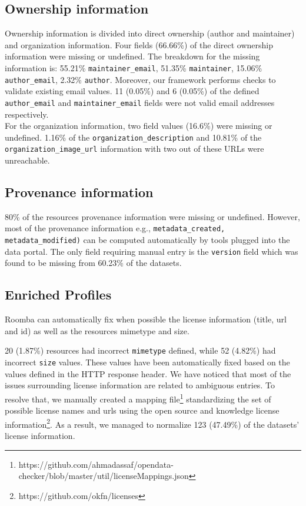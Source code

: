 \documentclass[runningheads,a4paper]{llncs}
\begin{document}
\subsection{Ownership information} Ownership information is divided into direct ownership (author and maintainer) and organization information. Four fields (66.66\%) of the direct ownership information were missing or undefined. The breakdown for the missing information is: 55.21\% \texttt{maintainer\_email}, 51.35\% \texttt{maintainer}, 15.06\% \texttt{author\_email}, 2.32\% \texttt{author}. Moreover, our framework performs checks to validate existing email values. 11 (0.05\%) and 6 (0.05\%) of the defined \texttt{author\_email} and \texttt{maintainer\_email} fields were not valid email addresses respectively.\\
For the organization information, two field values (16.6\%) were missing or undefined. 1.16\% of the \texttt{organization\_description} and 10.81\% of the \texttt{organization\-\_image\_url} information with two out of these URLs were unreachable.

\subsection{Provenance information} 80\% of the resources provenance information were missing or undefined. However, most of the provenance information e.g., \texttt{metadata\_created, \\metadata\_modified)} can be computed automatically by tools plugged into the data portal. The only field requiring manual entry is the \texttt{version} field which was found to be missing from 60.23\% of the datasets.

\subsection{Enriched Profiles}

Roomba can automatically fix when possible the license information (title, url and id) as well as the resources mimetype and size.

20 (1.87\%) resources had incorrect \texttt{mimetype} defined, while 52 (4.82\%) had incorrect \texttt{size} values. These values have been automatically fixed based on the values defined in the HTTP response header. We have noticed that most of the issues surrounding license information are related to ambiguous entries. To resolve that, we manually created a mapping file\footnote{https://github.com/ahmadassaf/opendata-checker/blob/master/util/licenseMappings.json} standardizing the set of possible license names and urls using the open source and knowledge license information\footnote{https://github.com/okfn/licenses}. As a result, we managed to normalize 123 (47.49\%) of the datasets' license information.
\end{document}
